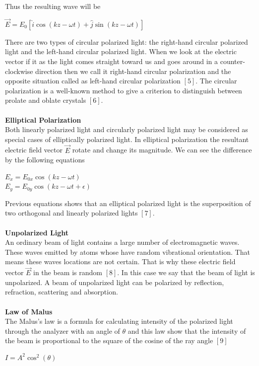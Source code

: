 \documentclass[a4paper,12pt]{report}
\begin{document}
Thus the resulting wave will be
\begin{center}
	$\vec{E}=E_{0}[\hat{i}\cos(kz-\omega t)+\hat{j}\sin(kz-\omega t)]$
\end{center}
There are two types of circular polarized light: the right-hand circular polarized light and the left-hand circular polarized light. When we look at the electric vector if it as the light comes straight toward us and goes around in a counter-clockwise direction then we call it right-hand circular polarization and the opposite situation called as left-hand circular polarization $[5]$. The circular polarization is a well-known method to give a criterion to distinguish between prolate and oblate crystals $[6]$.\\\\
\textbf{Elliptical Polarization}\\
Both linearly polarized light and circularly polarized light may be considered as special cases of elliptically polarized light. In elliptical polarization the resultant electric field vector $\vec{E}$ rotate and change its magnitude. We can see the difference by the following equations  
\begin{center}
	$E_{x}=E_{0x}\cos(kz-\omega t)$\\$E_{y}=E_{0y}\cos(kz-\omega t+\epsilon)$
\end{center}
Previous equations shows that an elliptical polarized light is the superposition of two orthogonal and linearly polarized lights $[7]$.\\\\
\textbf{Unpolarized Light}\\
An ordinary beam of light contains a large number of electromagnetic waves. These waves emitted by atoms whose have random vibrational orientation. That means these waves locations are not certain. That is why these electric field vector $\vec{E}$ in the beam is random $[8]$. In this case we say that the beam of light is unpolarized. A beam of unpolarized light can be polarized by reflection, refraction, scattering and absorption.\\\\
\textbf{Law of Malus }\\
The Malus's law is a formula for calculating intensity of the polarized light through the analyzer with an angle of $\theta$ and this law show that the intensity of the beam is proportional to the square of the cosine of the ray angle $[9]$ 
\begin{center}
	$I=A^{2}\cos^{2}(\theta)$
\end{center}
\end{document}
